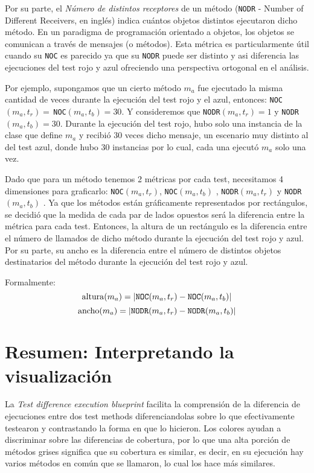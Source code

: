 \par Por su parte, el \emph{Número de distintos receptores} de un método ({\tt NODR} - Number of Different Receivers, en inglés) indica cuántos objetos distintos ejecutaron dicho método. En un paradigma de programación orientado a objetos, los objetos se comunican a través de mensajes (o métodos). Esta métrica es particularmente útil cuando su {\tt NOC} es parecido ya que su {\tt NODR} puede ser distinto y asi diferencia las ejecuciones del test rojo y azul ofreciendo una perspectiva ortogonal en el análisis.

\par Por ejemplo, supongamos que un cierto método $m_a$ fue ejecutado la misma cantidad de veces durante la ejecución del test rojo y el azul, entonces: {\tt NOC}$(m_a,t_r) = \,${\tt NOC}$(m_a,t_b) = 30$. Y consideremos que {\tt NODR}$(m_a,t_r) = 1$ y {\tt NODR}$(m_a,t_b) = 30$. Durante la ejecución del test rojo, hubo solo una instancia de la clase que define $m_a$ y recibió 30 veces dicho mensaje, un escenario muy distinto al del test azul, donde hubo 30 instancias por lo cual, cada una ejecutó $m_a$ solo una vez.

\par Dado que para un método tenemos 2 métricas por cada test, necesitamos 4 dimensiones para graficarlo: {\tt NOC}$(m_a,t_r)$, {\tt NOC}$(m_a,t_b)$ , {\tt NODR}$(m_a,t_r)$ y {\tt NODR}$(m_a,t_b)$ . Ya que los métodos están gráficamente representados por rectángulos, se decidió que la medida de cada par de lados opuestos será la diferencia entre la métrica para cada test. Entonces, la altura de un rectángulo es la diferencia entre el número de llamados de dicho método durante la ejecución del test rojo y azul. Por su parte, su ancho es la diferencia entre el número de distintos objetos destinatarios del método durante la ejecución del test rojo y azul. 

\par Formalmente:
\[ {\rm altura}(m_a) = \vert {\tt NOC}(m_a,t_r) - {\tt NOC}(m_a,t_b) \vert \]
\[ {\rm ancho}(m_a) = \vert {\tt NODR}(m_a,t_r) - {\tt NODR}(m_a,t_b) \vert \]


\section{Resumen: Interpretando la visualización}


\par La \emph{Test difference execution blueprint} facilita la comprensión de la diferencia de ejecuciones entre dos test methods diferenciandolas sobre lo que efectivamente testearon y contrastando la forma en que lo hicieron. Los colores ayudan a discriminar sobre las diferencias de cobertura, por lo que una alta porción de métodos grises significa que su cobertura es similar, es decir, en su ejecución hay varios métodos en común que se llamaron, lo cual los hace más similares.

